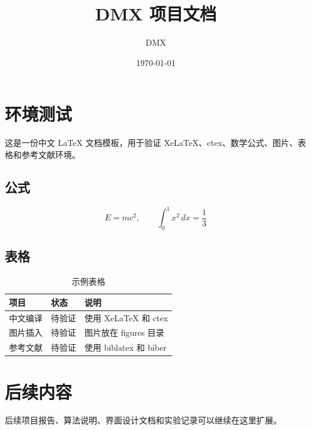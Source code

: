 \documentclass[UTF8,a4paper,12pt]{ctexart}
\title{DMX 项目文档}
\author{DMX}
\date{\today}
\begin{document}
\maketitle
\tableofcontents
\newpage

\section{环境测试}

这是一份中文 LaTeX 文档模板，用于验证 XeLaTeX、ctex、数学公式、图片、表格和参考文献环境。

\subsection{公式}

\[
  E = mc^2,\qquad \int_0^1 x^2\,dx = \frac{1}{3}
\]

\subsection{表格}

\begin{table}[H]
  \centering
  \caption{示例表格}
  \begin{tabular}{lll}
    \toprule
    项目 & 状态 & 说明 \\
    \midrule
    中文编译 & 待验证 & 使用 XeLaTeX 和 ctex \\
    图片插入 & 待验证 & 图片放在 figures 目录 \\
    参考文献 & 待验证 & 使用 biblatex 和 biber \\
    \bottomrule
  \end{tabular}
\end{table}

\section{后续内容}

后续项目报告、算法说明、界面设计文档和实验记录可以继续在这里扩展。

\nocite{dmx-template}
\printbibliography
\end{document}
